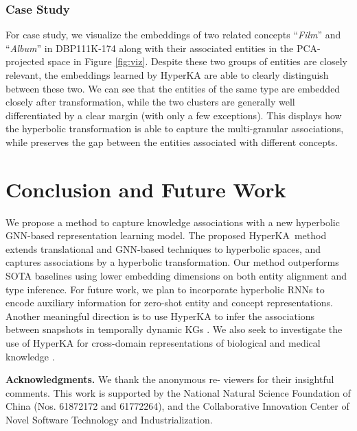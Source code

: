 \documentclass[11pt,a4paper]{article}
\newcommand{\modelname}{HyperKA\xspace}
\begin{document}
\subsubsection{Case Study}
\label{appendix:viz}
For case study, we visualize the embeddings of two related concepts ``\textit{Film}'' and ``\textit{Album}'' in DBP111K-174 along with their associated entities in the PCA-projected space in Figure \ref{fig:viz}. Despite these two groups of entities are closely relevant, the embeddings learned by \modelname are able to clearly distinguish between these two. We can see that the entities of the same type are embedded closely after transformation, while the two clusters are generally well differentiated by a clear margin (with only a few exceptions). This displays how the hyperbolic transformation is able to capture the multi-granular associations, while preserves the gap between the entities associated with different concepts.
 \section{Conclusion and Future Work}
We propose a method to capture knowledge associations with a new hyperbolic GNN-based representation learning model. The proposed \modelname\ method extends translational and GNN-based techniques to hyperbolic spaces, and captures associations by a hyperbolic transformation. Our method outperforms SOTA baselines using lower embedding dimensions on both entity alignment and type inference. For future work, we plan to incorporate hyperbolic RNNs \cite{HNN} to encode auxiliary information for zero-shot entity and concept representations. Another meaningful direction is to use \modelname to infer the associations between snapshots in temporally dynamic KGs \cite{Xu2020Inductive}. We also seek to investigate the use of \modelname for cross-domain representations of biological and medical knowledge \cite{BIO-JOIE}.

\smallskip\noindent\textbf{Acknowledgments.} We thank the anonymous re- viewers for their insightful comments. This work is supported by the National Natural Science Foundation of China (Nos. 61872172 and 61772264), and the Collaborative Innovation Center of Novel Software Technology and Industrialization. 


\clearpage
\appendix
\end{document}
